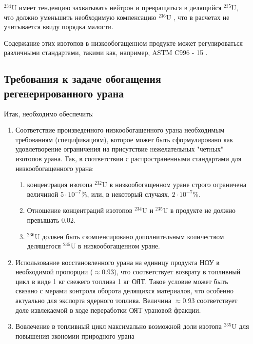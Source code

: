 $^{234}$U имеет тенденцию захватывать нейтрон и превращаться в делящийся $^{235}$U, что должно уменьшить необходимую компенсацию $^{236}$U \cite{dyachenkoIspolzovanieRegenerirovannogoUrana2012}, что в расчетах не учитывается ввиду порядка малости.

Содержание этих изотопов в низкообогащенном продукте может регулироваться различными стандартами, такими как, например, ASTM C996 - 15 \cite{c26committeeSpecificationUraniumHexafluoride}.

\subsection{Требования к задаче обогащения регенерированного урана}

Итак, необходимо обеспечить:
\begin{enumerate}
  \item Соответствие произведенного низкообогащенного урана необходимым требованиям (спецификациям), которое может быть сформулировано как удовлетворение ограничения на присутствие нежелательных "четных" изотопов урана. Так, в соответствии с распространенными стандартами для низкообогащенного урана:
  \begin{enumerate}
    \item концентрация изотопа $^{232}$U в низкообогащенном уране строго ограничена величиной $5\cdot10^{-7}$\%, или, в некоторый случаях, $2\cdot10^{-7}$\%.
    \item Отношение концентраций изотопов $^{234}$U и $^{235}$U в продукте не должно превышать 0.02.
    \item $^{236}$U должен быть скомпенсировано дополнительным количеством делящегося $^{235}$U в низкообогащенном уране.
  \end{enumerate}
  \item Использование восстановленного урана на единицу продукта НОУ в необходимой пропорции ($\approx$0.93), что соответствует возврату в топливный цикл в виде 1 кг свежего топлива 1 кг ОЯТ. Такое условие может быть связано с мерами контроля оборота делящихся материалов, что особенно актуально для экспорта ядерного топлива. Величина  $\approx$0.93 соответствует доле извлекаемой в ходе переработки ОЯТ урановой фракции.
  \item Вовлечение в топливный цикл максимально возможной доли изотопа $^{235}$U для повышения экономии природного урана
\end{enumerate}

